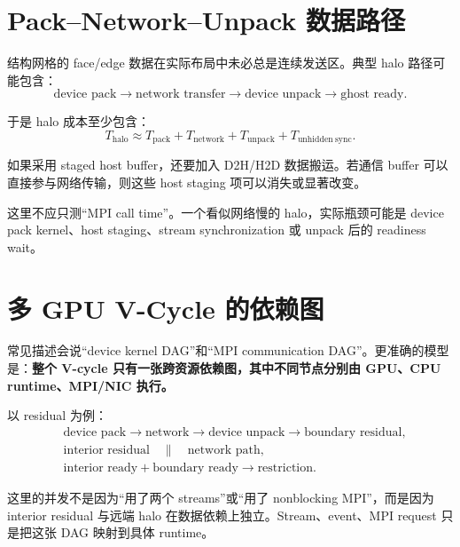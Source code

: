 \section{Pack--Network--Unpack 数据路径}

结构网格的 face/edge 数据在实际布局中未必总是连续发送区。典型 halo 路径可能包含：
\begin{equation}
\text{device pack}
\rightarrow
\text{network transfer}
\rightarrow
\text{device unpack}
\rightarrow
\text{ghost ready}.
\label{eq:distributed-gpu-halo-chain}
\end{equation}

于是 halo 成本至少包含：
\begin{equation}
T_{\mathrm{halo}}
\approx
T_{\mathrm{pack}}
+
T_{\mathrm{network}}
+
T_{\mathrm{unpack}}
+
T_{\mathrm{unhidden\ sync}}.
\end{equation}

如果采用 staged host buffer，还要加入 D2H/H2D 数据搬运。若通信 buffer 可以直接参与网络传输，则这些 host staging 项可以消失或显著改变。

这里不应只测“MPI call time”。一个看似网络慢的 halo，实际瓶颈可能是 device pack kernel、host staging、stream synchronization 或 unpack 后的 readiness wait。

\section{多 GPU V-Cycle 的依赖图}

常见描述会说“device kernel DAG”和“MPI communication DAG”。更准确的模型是：\textbf{整个 V-cycle 只有一张跨资源依赖图，其中不同节点分别由 GPU、CPU runtime、MPI/NIC 执行。}

以 residual 为例：
\begin{equation}
\boxed{
\begin{aligned}
&\text{device pack}
\rightarrow
\text{network}
\rightarrow
\text{device unpack}
\rightarrow
\text{boundary residual},
\\
&\text{interior residual}
\quad\parallel\quad
\text{network path},
\\
&\text{interior ready}
+
\text{boundary ready}
\rightarrow
\text{restriction}.
\end{aligned}
}
\label{eq:distributed-gpu-residual-dag}
\end{equation}

这里的并发不是因为“用了两个 streams”或“用了 nonblocking MPI”，而是因为 interior residual 与远端 halo 在数据依赖上独立。Stream、event、MPI request 只是把这张 DAG 映射到具体 runtime。

